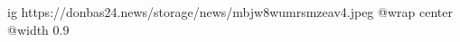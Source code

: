  
 
 
 
 

\ifcmt
  ig https://donbas24.news/storage/news/mbjw8wumrsmzeav4.jpeg
  @wrap center
  @width 0.9
\fi
